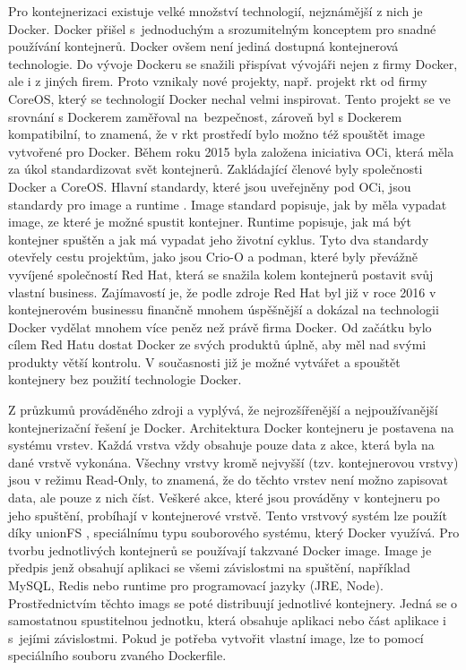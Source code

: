 Pro kontejnerizaci existuje velké množství technologií, nejznámější z nich je Docker. Docker přišel s jednoduchým a srozumitelným konceptem pro snadné používání kontejnerů. Docker ovšem není jediná dostupná kontejnerová technologie. Do vývoje Dockeru se snažili přispívat vývojáři nejen z firmy Docker, ale i z jiných firem. Proto vznikaly nové projekty, např. projekt rkt od firmy CoreOS, který se technologií Docker nechal velmi inspirovat. Tento projekt se ve srovnání s Dockerem zaměřoval na bezpečnost, zároveň byl s Dockerem kompatibilní, to znamená, že v rkt prostředí bylo možno též spouštět image vytvořené pro Docker. Během roku 2015 byla založena iniciativa OCi, která měla za úkol standardizovat svět kontejnerů. Zakládající členové byly společnosti Docker a CoreOS. Hlavní standardy, které jsou uveřejněny pod OCi, jsou standardy pro image a runtime \cite{OCI_standard}. Image standard popisuje, jak by měla vypadat image, ze které je možné spustit kontejner. Runtime popisuje, jak má být kontejner spuštěn a jak má vypadat jeho životní cyklus. Tyto dva standardy otevřely cestu projektům, jako jsou Crio-O a podman, které byly převážně vyvíjené společností Red Hat, která se snažila kolem kontejnerů postavit svůj vlastní business. Zajímavostí je, že podle zdroje \cite{redhat_docker} Red Hat byl již v roce 2016 v kontejnerovém businessu finančně mnohem úspěšnější a dokázal na technologii Docker vydělat mnohem více peněz než právě firma Docker. Od začátku bylo cílem Red Hatu dostat Docker ze svých produktů úplně, aby měl nad svými produkty větší kontrolu. V současnosti již je možné vytvářet a spouštět kontejnery bez použití technologie Docker.

Z průzkumů prováděného zdroji \cite{sysdig_survey} a \cite{hq_survey} vyplývá, že nejrozšířenější a nejpoužívanější kontejnerizační řešení je Docker. Architektura Docker kontejneru je postavena na systému vrstev. Každá vrstva vždy obsahuje pouze data z akce, která byla na dané vrstvě vykonána. Všechny vrstvy kromě nejvyšší (tzv. kontejnerovou vrstvy) jsou v režimu Read-Only, to znamená, že do těchto vrstev není možno zapisovat data, ale pouze z nich číst. Veškeré akce, které jsou prováděny v kontejneru po jeho spuštění, probíhají v kontejnerové vrstvě. Tento vrstvový systém lze použít díky unionFS \cite{unionfs}, speciálnímu typu souborového systému, který Docker využívá. Pro tvorbu jednotlivých kontejnerů se používají takzvané Docker image. Image je předpis jenž obsahují aplikaci se všemi závislostmi na spuštění, například MySQL, Redis nebo runtime pro programovací jazyky (JRE, Node). Prostřednictvím těchto imags se poté distribuují jednotlivé kontejnery. Jedná se o samostatnou spustitelnou jednotku, která obsahuje aplikaci nebo část aplikace i s jejími závislostmi. Pokud je potřeba vytvořit vlastní image, lze to pomocí speciálního souboru zvaného Dockerfile.

